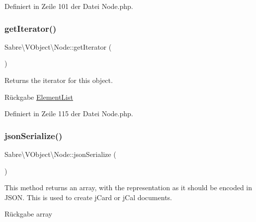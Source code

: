 Definiert in Zeile 101 der Datei Node.\+php.

\mbox{\label{class_sabre_1_1_v_object_1_1_node_a195a12fb85cc11562f8081b3810e3a17}} 
\subsubsection{\texorpdfstring{get\+Iterator()}{getIterator()}}
{\footnotesize\ttfamily Sabre\textbackslash{}\+V\+Object\textbackslash{}\+Node\+::get\+Iterator (\begin{DoxyParamCaption}{ }\end{DoxyParamCaption})}

Returns the iterator for this object.

\begin{DoxyReturn}{Rückgabe}
\mbox{\hyperlink{class_sabre_1_1_v_object_1_1_element_list}{Element\+List}} 
\end{DoxyReturn}


Definiert in Zeile 115 der Datei Node.\+php.

\mbox{\label{class_sabre_1_1_v_object_1_1_node_a0194e7b8933a2cf2ee10b353a73cd4f8}} 
\subsubsection{\texorpdfstring{json\+Serialize()}{jsonSerialize()}}
{\footnotesize\ttfamily Sabre\textbackslash{}\+V\+Object\textbackslash{}\+Node\+::json\+Serialize (\begin{DoxyParamCaption}{ }\end{DoxyParamCaption})\hspace{0.3cm}{\ttfamily [abstract]}}

This method returns an array, with the representation as it should be encoded in J\+S\+ON. This is used to create j\+Card or j\+Cal documents.

\begin{DoxyReturn}{Rückgabe}
array 
\end{DoxyReturn}
\mbox{\label{class_sabre_1_1_v_object_1_1_node_aaf1b8e12e5bb867694018646b3324b68}} 
